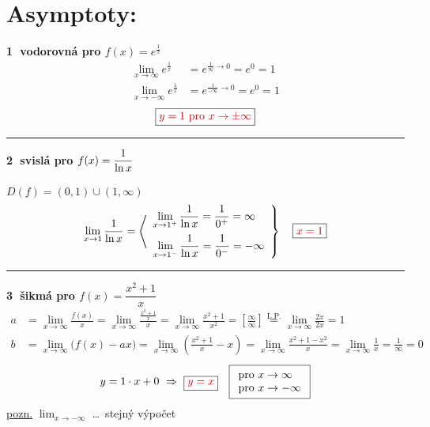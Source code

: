 \documentclass[11pt,a4paper]{article}
\newcommand{\vysl}[1]{\boxed{\color{red!75!black}#1}}
\newcommand{\tm}[2]{\tikz[remember picture, baseline=(#1.base)]\node[inner sep=0pt, outer sep=1pt] (#1) {$\displaystyle #2$};}
\begin{document}
\newpage
\section*{Asymptoty:}

\textbf{\textcircled{1} vodorovná pro $f(x)=e^{\frac1x}$}
\begin{align*}
\lim_{x\to\infty}e^{\frac1x} &= e^{\frac1\infty\to0} = e^0 = 1\\
\lim_{x\to-\infty}e^{\frac1x} &= e^{\frac1{-\infty}\to0} = e^0 = 1
\end{align*}
\[ \vysl{y=1 \text{ pro } x\to\pm\infty} \]

\hrule
\medskip
\textbf{\textcircled{2} svislá pro $f(x)=\tm{fl}{\frac{1}{\ln x}}$}

\medskip
\hspace*{1.5em}$D(f)=(0,1)\cup(1,\infty)$
\[
\lim_{x\to1}\frac{1}{\ln x} = \left\langle\begin{array}{l}
\displaystyle\lim_{x\to1^+}\frac{1}{\ln x} = \frac{1}{0^+} = \infty\\[10pt]
\displaystyle\lim_{x\to1^-}\frac{1}{\ln x} = \frac{1}{0^-} = -\infty
\end{array}\right\}\quad \vysl{x=1}
\]

\hrule
\medskip
\textbf{\textcircled{3} šikmá pro $f(x)=\dfrac{x^2+1}{x}$}
\begin{align*}
a &= \lim_{x\to\infty}\frac{f(x)}{x} = \lim_{x\to\infty}\frac{\frac{x^2+1}{x}}{x} = \lim_{x\to\infty}\frac{x^2+1}{x^2}
= \left[\frac\infty\infty\right] \overset{\text{L.P.}}{=} \lim_{x\to\infty}\frac{2x}{2x} = 1\\
b &= \lim_{x\to\infty}\big(f(x)-ax\big) = \lim_{x\to\infty}\left(\frac{x^2+1}{x}-x\right)
= \lim_{x\to\infty}\frac{x^2+1-x^2}{x} = \lim_{x\to\infty}\frac1x = \frac1\infty = 0
\end{align*}
\[
y=1\cdot x+0 \ \Rightarrow\ \vysl{y=x} \quad \boxed{\begin{array}{l}\text{pro } x\to\infty\\ \text{pro } x\to-\infty\end{array}}
\]
\underline{pozn.} $\displaystyle\lim_{x\to-\infty}$ \dots\ stejný výpočet
\end{document}

